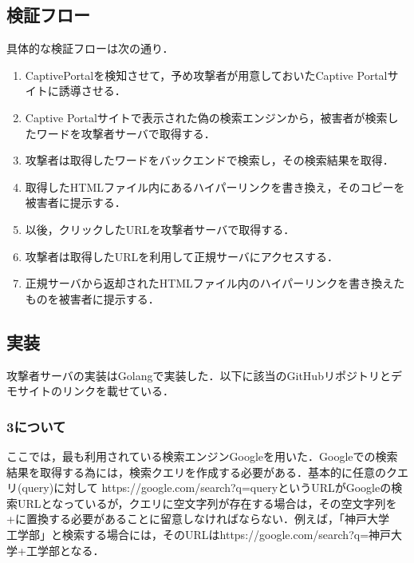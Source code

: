 \documentclass[dvipdfmx]{jsarticle}
\begin{document}
        \subsection{検証フロー}
            具体的な検証フローは次の通り．
            \begin{enumerate}
                \item CaptivePortalを検知させて，予め攻撃者が用意しておいたCaptive Portalサイトに誘導させる．
                \item Captive Portalサイトで表示された偽の検索エンジンから，被害者が検索したワードを攻撃者サーバで取得する．
                \item 攻撃者は取得したワードをバックエンドで検索し，その検索結果を取得．
                \item 取得したHTMLファイル内にあるハイパーリンクを書き換え，そのコピーを被害者に提示する．
                \item 以後，クリックしたURLを攻撃者サーバで取得する．
                \item 攻撃者は取得したURLを利用して正規サーバにアクセスする．
                \item 正規サーバから返却されたHTMLファイル内のハイパーリンクを書き換えたものを被害者に提示する．
            \end{enumerate}
        \subsection{実装}
            攻撃者サーバの実装はGolangで実装した．以下に該当のGitHubリポジトリとデモサイトのリンクを載せている．
        \subsubsection{3について}
            ここでは，最も利用されている検索エンジンGoogleを用いた．Googleでの検索結果を取得する為には，検索クエリを作成する必要がある．基本的に任意のクエリ(query)に対して https://google.com/search?q=queryというURLがGoogleの検索URLとなっているが，クエリに空文字列が存在する場合は，その空文字列を+に置換する必要があることに留意しなければならない．例えば，「神戸大学　工学部」と検索する場合には，そのURLはhttps://google.com/search?q=神戸大学+工学部となる．
\end{document}
